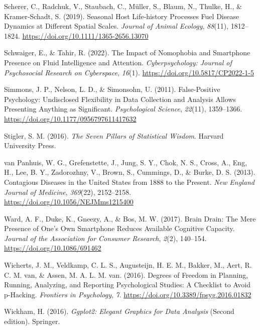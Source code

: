 \documentclass[
  a4paper,
]{scrbook}
\newlength{\cslhangindent}
\newenvironment{CSLReferences}[2] %
 {\begin{list}{}{%
  \setlength{\itemindent}{0pt}
  \setlength{\leftmargin}{0pt}
  \setlength{\parsep}{0pt}
  \ifodd #1
   \setlength{\leftmargin}{\cslhangindent}
   \setlength{\itemindent}{-1\cslhangindent}
  \fi
  \setlength{\itemsep}{#2\baselineskip}}}
 {\end{list}}
\theoremstyle{definition}
\theoremstyle{definition}
\theoremstyle{definition}
\theoremstyle{remark}
\begin{document}
\begin{CSLReferences}{1}{0}
Scherer, C., Radchuk, V., Staubach, C., Müller, S., Blaum, N., Thulke,
H., \& Kramer‐Schadt, S. (2019). Seasonal Host Life‐history Processes
Fuel Disease Dynamics at Different Spatial Scales. \emph{Journal of
Animal Ecology}, \emph{88}(11), 1812--1824.
\url{https://doi.org/10.1111/1365-2656.13070}

Schwaiger, E., \& Tahir, R. (2022). The Impact of Nomophobia and
Smartphone Presence on Fluid Intelligence and Attention.
\emph{Cyberpsychology: Journal of Psychosocial Research on Cyberspace},
\emph{16}(1). \url{https://doi.org/10.5817/CP2022-1-5}

Simmons, J. P., Nelson, L. D., \& Simonsohn, U. (2011). False-{Positive
Psychology}: {Undisclosed Flexibility} in {Data Collection} and
{Analysis Allows Presenting Anything} as {Significant}.
\emph{Psychological Science}, \emph{22}(11), 1359--1366.
\url{https://doi.org/10.1177/0956797611417632}

Stigler, S. M. (2016). \emph{The Seven Pillars of Statistical Wisdom}.
Harvard University Press.

van Panhuis, W. G., Grefenstette, J., Jung, S. Y., Chok, N. S., Cross,
A., Eng, H., Lee, B. Y., Zadorozhny, V., Brown, S., Cummings, D., \&
Burke, D. S. (2013). Contagious {Diseases} in the {United States} from
1888 to the {Present}. \emph{New England Journal of Medicine},
\emph{369}(22), 2152--2158. \url{https://doi.org/10.1056/NEJMms1215400}

Ward, A. F., Duke, K., Gneezy, A., \& Bos, M. W. (2017). Brain {Drain}:
{The Mere Presence} of {One}'s {Own Smartphone Reduces Available
Cognitive Capacity}. \emph{Journal of the Association for Consumer
Research}, \emph{2}(2), 140--154. \url{https://doi.org/10.1086/691462}

Wicherts, J. M., Veldkamp, C. L. S., Augusteijn, H. E. M., Bakker, M.,
Aert, R. C. M. van, \& Assen, M. A. L. M. van. (2016). Degrees of
{Freedom} in {Planning}, {Running}, {Analyzing}, and {Reporting
Psychological Studies}: {A Checklist} to {Avoid} p-{Hacking}.
\emph{Frontiers in Psychology}, \emph{7}.
\url{https://doi.org/10.3389/fpsyg.2016.01832}

Wickham, H. (2016). \emph{Ggplot2: Elegant Graphics for Data Analysis}
(Second edition). Springer.


\end{CSLReferences}
\end{document}
